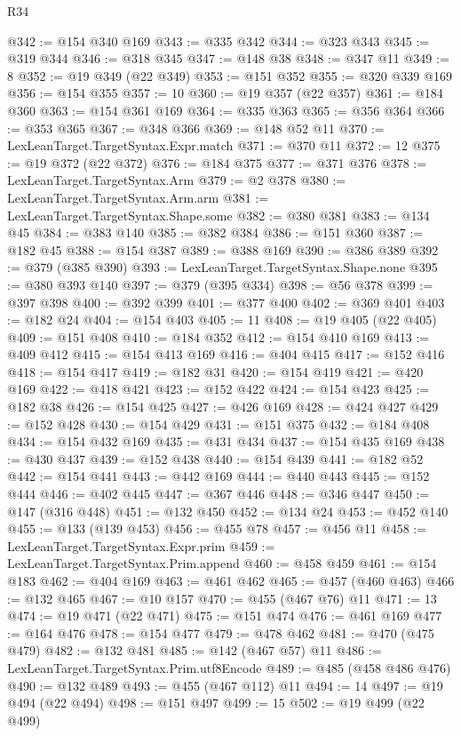 \begin{lexlean}{R34}
\begin{coremodule}
@342 := @154 @340 @169
@343 := @335 @342
@344 := @323 @343
@345 := @319 @344
@346 := @318 @345
@347 := @148 @38
@348 := @347 @11
@349 := 8
@352 := @19 @349 (@22 @349)
@353 := @151 @352
@355 := @320 @339 @169
@356 := @154 @355
@357 := 10
@360 := @19 @357 (@22 @357)
@361 := @184 @360
@363 := @154 @361 @169
@364 := @335 @363
@365 := @356 @364
@366 := @353 @365
@367 := @348 @366
@369 := @148 @52 @11
@370 := LexLeanTarget.TargetSyntax.Expr.match
@371 := @370 @11
@372 := 12
@375 := @19 @372 (@22 @372)
@376 := @184 @375
@377 := @371 @376
@378 := LexLeanTarget.TargetSyntax.Arm
@379 := @2 @378
@380 := LexLeanTarget.TargetSyntax.Arm.arm
@381 := LexLeanTarget.TargetSyntax.Shape.some
@382 := @380 @381
@383 := @134 @45
@384 := @383 @140
@385 := @382 @384
@386 := @151 @360
@387 := @182 @45
@388 := @154 @387
@389 := @388 @169
@390 := @386 @389
@392 := @379 (@385 @390)
@393 := LexLeanTarget.TargetSyntax.Shape.none
@395 := @380 @393 @140
@397 := @379 (@395 @334)
@398 := @56 @378
@399 := @397 @398
@400 := @392 @399
@401 := @377 @400
@402 := @369 @401
@403 := @182 @24
@404 := @154 @403
@405 := 11
@408 := @19 @405 (@22 @405)
@409 := @151 @408
@410 := @184 @352
@412 := @154 @410 @169
@413 := @409 @412
@415 := @154 @413 @169
@416 := @404 @415
@417 := @152 @416
@418 := @154 @417
@419 := @182 @31
@420 := @154 @419
@421 := @420 @169
@422 := @418 @421
@423 := @152 @422
@424 := @154 @423
@425 := @182 @38
@426 := @154 @425
@427 := @426 @169
@428 := @424 @427
@429 := @152 @428
@430 := @154 @429
@431 := @151 @375
@432 := @184 @408
@434 := @154 @432 @169
@435 := @431 @434
@437 := @154 @435 @169
@438 := @430 @437
@439 := @152 @438
@440 := @154 @439
@441 := @182 @52
@442 := @154 @441
@443 := @442 @169
@444 := @440 @443
@445 := @152 @444
@446 := @402 @445
@447 := @367 @446
@448 := @346 @447
@450 := @147 (@316 @448)
@451 := @132 @450
@452 := @134 @24
@453 := @452 @140
@455 := @133 (@139 @453)
@456 := @455 @78
@457 := @456 @11
@458 := LexLeanTarget.TargetSyntax.Expr.prim
@459 := LexLeanTarget.TargetSyntax.Prim.append
@460 := @458 @459
@461 := @154 @183
@462 := @404 @169
@463 := @461 @462
@465 := @457 (@460 @463)
@466 := @132 @465
@467 := @10 @157
@470 := @455 (@467 @76) @11
@471 := 13
@474 := @19 @471 (@22 @471)
@475 := @151 @474
@476 := @461 @169
@477 := @164 @476
@478 := @154 @477
@479 := @478 @462
@481 := @470 (@475 @479)
@482 := @132 @481
@485 := @142 (@467 @57) @11
@486 := LexLeanTarget.TargetSyntax.Prim.utf8Encode
@489 := @485 (@458 @486 @476)
@490 := @132 @489
@493 := @455 (@467 @112) @11
@494 := 14
@497 := @19 @494 (@22 @494)
@498 := @151 @497
@499 := 15
@502 := @19 @499 (@22 @499)

\end{coremodule}
\end{lexlean}
